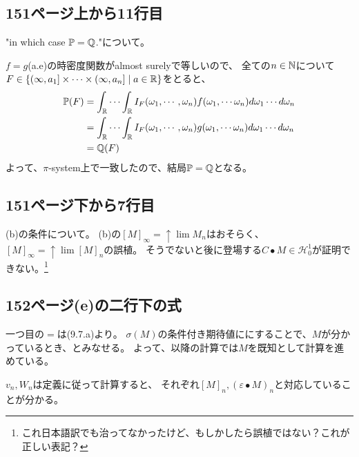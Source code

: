   \subsection{151ページ上から11行目}
    "in which case ${\mathbb{P}} = {\mathbb{Q}}$."について。

    $f = g$(a.e)の時密度関数がalmost surelyで等しいので、
    全ての$n \in {\mathbb{N}}$について
    $F \in \{(\infty,a_1] \times \cdots \times (\infty,a_n] \mid a \in {\mathbb{R}}\}$をとると、
    \begin{align*}
      {\mathbb{P}}(F) &= \int_{{\mathbb{R}}}\cdots \int_{{\mathbb{R}}}I_F(\omega_1,\cdots ,\omega_n)f(\omega_1,\cdots \omega_n)d\omega_1 \cdots d\omega_n\\
      &= \int_{{\mathbb{R}}} \cdots \int_{{\mathbb{R}}}I_F(\omega_1,\cdots ,\omega_n)g(\omega_1,\cdots \omega_n)d\omega_1 \cdots d\omega_n\\
      &= {\mathbb{Q}}(F)
    \end{align*}
    よって、$\pi$-system上で一致したので、結局${\mathbb{P}} = {\mathbb{Q}}$となる。

  \subsection{151ページ下から7行目}
    (b)の条件について。
    (b)の$[M]_{\infty} = \uparrow \lim M_n$はおそらく、
    $[M]_{\infty} = \uparrow \lim [M]_n$の誤植。
    そうでないと後に登場する$C \bullet M \in \mathcal{H}_0^1$が証明できない。\footnote{これ日本語訳でも治ってなかったけど、もしかしたら誤植ではない？これが正しい表記？}

  \subsection{152ページ(e)の二行下の式}
    一つ目の$=$は(9.7.a)より。
    $\sigma(M)$の条件付き期待値ににすることで、$M$が分かっているとき、とみなせる。
    よって、以降の計算では$M$を既知として計算を進めている。

    $v_n,W_n$は定義に従って計算すると、
    それぞれ$[M]_n,(\varepsilon\bullet M)_n$と対応していることが分かる。

